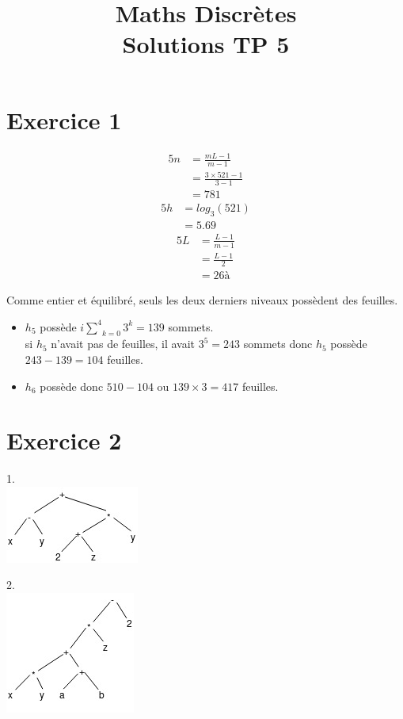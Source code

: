 \documentclass[fontsize=10pt]{article}
\title{\textbf{Maths Discrètes}\\ Solutions TP 5}
\date{}
\begin{document}
\maketitle %


\section*{Exercice 1}

\begin{alignat*}{5}
n &= \frac{mL -1}{m-1}\\
&= \frac{3\times 521 -1}{3-1}\\
&= 781
\end{alignat*}
\begin{alignat*}{5}
h &= log_3(521)\\
&= 5.69
\end{alignat*}
\begin{alignat*}{5}
L &= \frac{L -1}{m-1}\\
&= \frac{L-1}{2}\\
&= 26à
\end{alignat*}

Comme entier et équilibré, seuls les deux derniers niveaux possèdent des feuilles.
\begin{itemize}
\item $h_5$ possède $i\underset{k=0}{\overset{4}{\sum}}3^k = 139$ sommets.\\
si $h_5$ n'avait pas de feuilles, il avait $3^5 = 243$ sommets donc $h_5$ possède $243-139 =104$ feuilles.
\item $h_6$ possède donc $510-104$ ou $139 \times 3 = 417$ feuilles.
\end{itemize}


\section*{Exercice 2}


1.\\ \includegraphics[scale=1]{TP6Exo2_1.jpg} 


\hspace{-0.58cm}2.\\ \includegraphics[scale=1]{TP6Exo2_2.jpg} 
\end{document}
